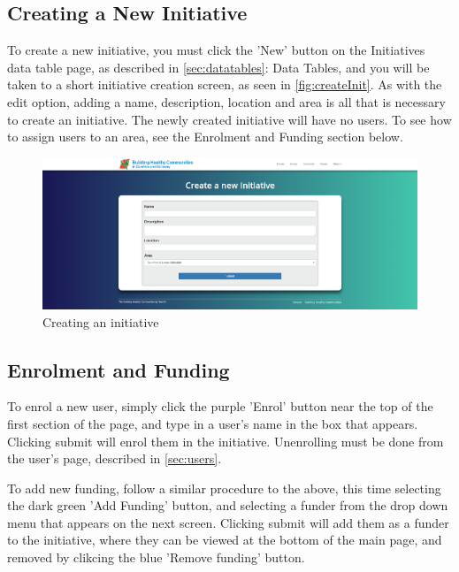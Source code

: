 \documentclass{bhcguides}
\begin{document}
\subsection{Creating a New Initiative}
\label{ssec:createinit}

To create a new initiative, you must click the 'New' button on the Initiatives data table page, as described in \autoref{sec:datatables}: Data Tables, and you will be taken to a short initiative creation screen, as seen in \autoref{fig:createInit}. As with the edit option, adding a name, description, location and area is all that is necessary to create an initiative. The newly created initiative will have no users. To see how to assign users to an area, see the Enrolment and Funding section below.

\begin{figure}[h!]
 \centerline{\includegraphics[width=\textwidth, height=\textheight, keepaspectratio]{createinitiative.png}}
 \caption{Creating an initiative}
 \label{fig:createInit}
\end{figure}

\subsection{Enrolment and Funding}
\label{ssec:initenrolfund}

To enrol a new user, simply click the purple 'Enrol' button near the top of the first section of the page, and type in a user's name in the box that appears. Clicking submit will enrol them in the initiative. Unenrolling must be done from the user's page, described in \autoref{sec:users}.

To add new funding, follow a similar procedure to the above, this time selecting the dark green 'Add Funding' button, and selecting a funder from the drop down menu that appears on the next screen. Clicking submit will add them as a funder to the initiative, where they can be viewed at the bottom of the main page, and removed by clikcing the blue 'Remove funding' button.
\end{document}
